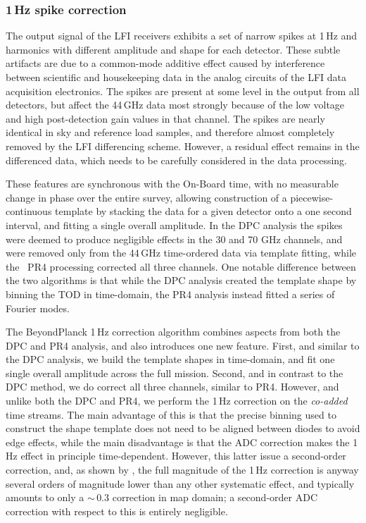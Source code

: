 \documentclass[twocolumn]{aa}
\begin{document}
\subsubsection{1\,Hz spike correction}

The output signal of the LFI receivers exhibits a set of narrow spikes
at 1\,Hz and harmonics with different amplitude and shape for each
detector.  These subtle artifacts are due to a common-mode additive
effect caused by interference between scientific and housekeeping data
in the analog circuits of the LFI data acquisition electronics.  The
spikes are present at some level in the output from all detectors, but
affect the 44\,GHz data most strongly because of the low voltage and
high post-detection gain values in that channel. The spikes are
nearly identical in sky and reference load samples, and therefore 
almost completely removed by the LFI differencing scheme. However, a
residual effect remains in the differenced data, which needs to be
carefully considered in the data processing.

These features are synchronous with the On-Board time, with no
measurable change in phase over the entire survey, allowing
construction of a piecewise-continuous template by stacking the data
for a given detector onto a one second interval, and fitting a single
overall amplitude. In the DPC analysis the spikes were deemed to
produce negligible effects in the 30 and 70 GHz channels, and were
removed only from the 44\,GHz time-ordered data via template fitting,
while the \Planck\ PR4 processing corrected all three channels. One
notable difference between the two algorithms is that while the DPC
analysis created the template shape by binning the TOD in time-domain,
the PR4 analysis instead fitted a series of Fourier modes.

The BeyondPlanck 1\,Hz correction algorithm combines aspects from both
the DPC and PR4 analysis, and also introduces one new feature. First,
and similar to the DPC analysis, we build the template shapes in
time-domain, and fit one single overall amplitude across the full
mission. Second, and in contrast to the DPC method, we do correct all
three channels, similar to PR4. However, and unlike both the DPC and
PR4, we perform the 1\,Hz correction on the \emph{co-added} time
streams. The main advantage of this is that the precise binning used
to construct the shape template does not need to be aligned between
diodes to avoid edge effects, while the main disadvantage is that the
ADC correction makes the 1\,Hz effect in principle
time-dependent. However, this latter issue a second-order correction,
and, as shown by \citet{bp10}, the full magnitude of the 1\,Hz
correction is anyway several orders of magnitude lower than any other
systematic effect, and typically amounts to only a $\sim\,$0.3\muK
correction in map domain; a second-order ADC correction with respect
to this is entirely negligible. 
\end{document}
